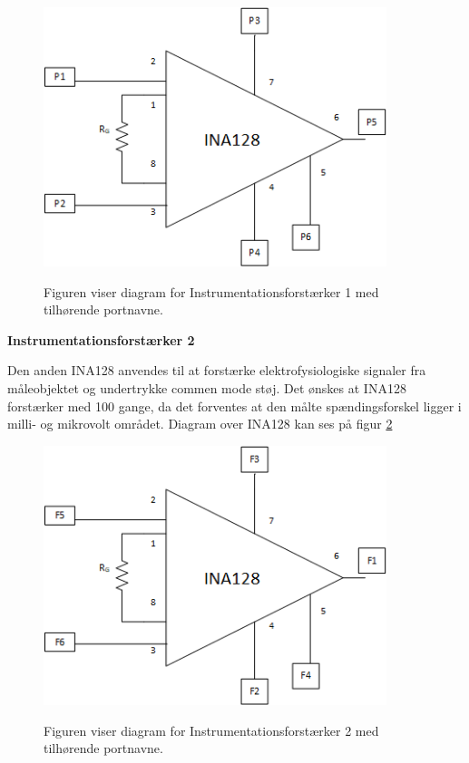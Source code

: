 \begin{figure}[H]
\centering
{\includegraphics[width=10cm]
{Figure/instrumentation1}}
\caption{Figuren viser diagram for Instrumentationsforstærker 1 med tilhørende portnavne.}
\label{fig:instrumentation1}
\end{figure}



\pagebreak


\textbf{Instrumentationsforstærker 2}

Den anden INA128 anvendes til at forstærke elektrofysiologiske signaler fra måleobjektet og undertrykke commen mode støj. Det ønskes at INA128 forstærker med 100 gange, da det forventes at den målte spændingsforskel ligger i milli- og mikrovolt området\cite{PeterJohansen2014}. Diagram over INA128 kan ses på figur \ref{fig:instrumentation2}

\begin{figure}[H]
\centering
{\includegraphics[width=10cm]
{Figure/instrumentation2}}
\caption{Figuren viser diagram for Instrumentationsforstærker 2 med tilhørende portnavne.}
\label{fig:instrumentation2}
\end{figure}

